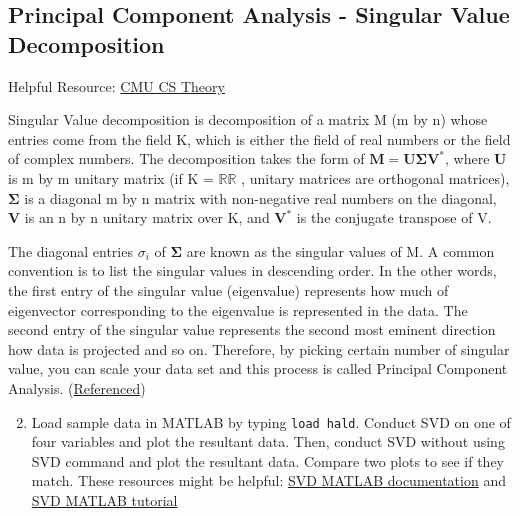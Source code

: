 \documentclass{tufte-handout}
\begin{document}
\subsection{Principal Component Analysis - Singular Value Decomposition}
Helpful Resource: 
\href{https://www.cs.cmu.edu/~venkatg/teaching/CStheory-infoage/book-chapter-4.pdf}{CMU CS Theory}

Singular Value decomposition is decomposition of a matrix M (m by n) whose entries come from the field K, which is either the field of real numbers or the field of complex numbers. The decomposition takes the form of ${\displaystyle \mathbf {M} =\mathbf {U} {\boldsymbol {\Sigma }}\mathbf {V} ^{*}}$, where $\mathbf{U}$ is m by m unitary matrix (if  K = ${\displaystyle \mathbb {R} } \mathbb {R}$ , unitary matrices are orthogonal matrices), $\boldsymbol{{\Sigma}}$ is a diagonal m by n matrix with non-negative real numbers on the diagonal, $\mathbf{V}$ is an n by n unitary matrix over K, and
$\mathbf{{V}^{*}}$ is the conjugate transpose of V.

The diagonal entries ${\sigma_{i}}$ of $\mathbf{\Sigma}$ are known as the singular values of M. A common convention is to list the singular values in descending order. In the other words, the first entry of the singular value (eigenvalue) represents how much of eigenvector corresponding to the eigenvalue is represented in the data. The second entry of the singular value represents the second most eminent direction how data is projected and so on. Therefore, by picking certain number of singular value, you can scale your data set and this process is called Principal Component Analysis. (\href{https://en.wikipedia.org/wiki/Singular-value_decomposition}{Referenced})



\begin{enumerate}
	\setcounter{enumi}{1}
	\item Load sample data in MATLAB by typing \verb|load hald|. Conduct SVD on one of four variables and plot the resultant data. Then, conduct SVD without using SVD command and plot the resultant data. Compare two plots to see if they match. These resources might be helpful: \href{https://www.mathworks.com/help/matlab/ref/svd.html}{SVD MATLAB documentation} and \href{http://www.matrixlab-examples.com/singular-value-decomposition.html}{SVD MATLAB tutorial}

\end{enumerate}


\end{document}
